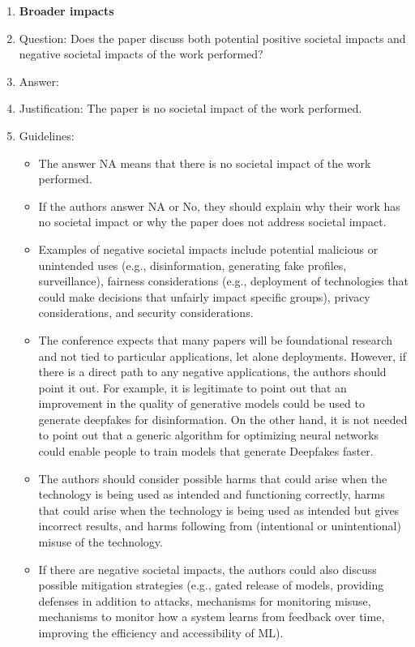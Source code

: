 \documentclass{article}
\begin{document}
\begin{enumerate}
\item {\bf Broader impacts}
    \item[] Question: Does the paper discuss both potential positive societal impacts and negative societal impacts of the work performed?
    \item[] Answer: \answerNA{} %
    \item[] Justification: The paper is no societal impact of the work performed.
    \item[] Guidelines:
    \begin{itemize}
        \item The answer NA means that there is no societal impact of the work performed.
        \item If the authors answer NA or No, they should explain why their work has no societal impact or why the paper does not address societal impact.
        \item Examples of negative societal impacts include potential malicious or unintended uses (e.g., disinformation, generating fake profiles, surveillance), fairness considerations (e.g., deployment of technologies that could make decisions that unfairly impact specific groups), privacy considerations, and security considerations.
        \item The conference expects that many papers will be foundational research and not tied to particular applications, let alone deployments. However, if there is a direct path to any negative applications, the authors should point it out. For example, it is legitimate to point out that an improvement in the quality of generative models could be used to generate deepfakes for disinformation. On the other hand, it is not needed to point out that a generic algorithm for optimizing neural networks could enable people to train models that generate Deepfakes faster.
        \item The authors should consider possible harms that could arise when the technology is being used as intended and functioning correctly, harms that could arise when the technology is being used as intended but gives incorrect results, and harms following from (intentional or unintentional) misuse of the technology.
        \item If there are negative societal impacts, the authors could also discuss possible mitigation strategies (e.g., gated release of models, providing defenses in addition to attacks, mechanisms for monitoring misuse, mechanisms to monitor how a system learns from feedback over time, improving the efficiency and accessibility of ML).
    \end{itemize}
    

\end{enumerate}
\end{document}
